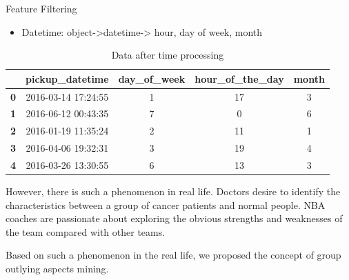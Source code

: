 \documentclass[
 size=14pt,
 paper=smartboard,  %
 mode=present, 		%
 display=slides, 	%
 style=tuliplab,  	%
 pauseslide,
 fleqn,leqno]{powerdot}
\begin{document}


\begin{slide}{Feature Filtering}

\begin{itemize}
\item
Datetime: object->datetime-> hour, day of week, month
\end{itemize}


\begin{table}[]
\setlength{\abovecaptionskip}{0pt}
\setlength{\belowcaptionskip}{10pt}
\centering
\caption{Data after time processing}
\begin{tabular}{ccccc}
\hline
\textbf{}  & \textbf{pickup\_datetime} & \textbf{day\_of\_week} & \textbf{hour\_of\_the\_day} & \textbf{month} \\
\hline
\textbf{0} & 2016-03-14 17:24:55       & 1                      & 17                          & 3              \\
\textbf{1} & 2016-06-12 00:43:35       & 7                      & 0                           & 6              \\
\textbf{2} & 2016-01-19 11:35:24       & 2                      & 11                          & 1              \\
\textbf{3} & 2016-04-06 19:32:31       & 3                      & 19                          & 4              \\
\textbf{4} & 2016-03-26 13:30:55       & 6                      & 13                          & 3           \\
\hline
\end{tabular}
\end{table}


\begin{note}
However,
there is such a phenomenon in real life.
Doctors desire to identify the characteristics between
a group of cancer patients and normal people.
NBA coaches are passionate about exploring the obvious strengths and
weaknesses of the team compared with other teams.

Based on such a phenomenon in the real life,
we proposed the concept of group outlying aspects mining.
\end{note}

\end{slide}
\end{document}
